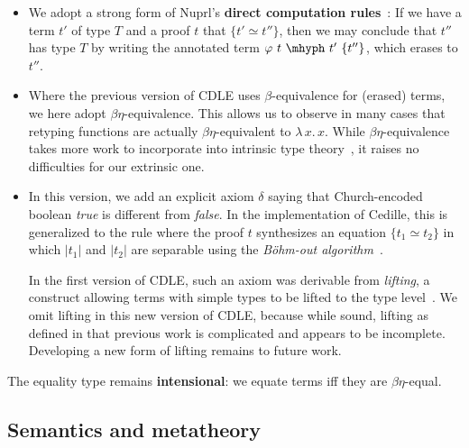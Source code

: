 \documentclass{article}
\newcommand{\absu}[3]{{#1}\, #2.\, #3}
\begin{document}
\begin{itemize}
\item We adopt a strong form of Nuprl's \textbf{direct computation rules}~\cite{constable+86}:
  If we have a term $t'$ of type $T$ and a proof $t$ that $\{ t' \simeq t''\}$, then we may conclude that
  $t''$ has type $T$ by writing the annotated term $\varphi\ t\ \mhyph\ t'\ \{t''\}$, which
  erases to $t''$.
\item Where the previous version of CDLE uses $\beta$-equivalence for (erased) terms, we here adopt $\beta\eta$-equivalence.  This
  allows us to observe in many cases that retyping functions are actually $\beta\eta$-equivalent to $\absu{\lambda}{x}{x}$.
  While $\beta\eta$-equivalence takes more work to incorporate into intrinsic 
  type theory~\cite{geuvers92},
  it raises no difficulties for our extrinsic one.
\item In this version, we add an explicit axiom $\delta$ saying that Church-encoded boolean \emph{true} is different from
  \emph{false}.
  In the implementation of Cedille, this is generalized to the rule where the
  proof \(t\) synthesizes an equation \(\{t_1 \simeq t_2\}\) in which \(|t_1|\)
  and \(|t_2|\) are separable using the \emph{B\"ohm-out algorithm}~\cite{BDPR79_Bohm-Algorithm}.

  In the first version of CDLE, such an axiom was derivable from \emph{lifting},
  a construct allowing terms with simple types to be lifted to the type
  level~\cite{stump17}.
  We omit lifting in this new version of CDLE, because while
  sound, lifting as defined in that previous work is complicated and appears to be incomplete.  Developing a new
  form of lifting remains to future work.
\end{itemize}

The equality type remains \textbf{intensional}: we equate terms iff they are $\beta\eta$-equal.  

\subsection{Semantics and metatheory}
\end{document}
